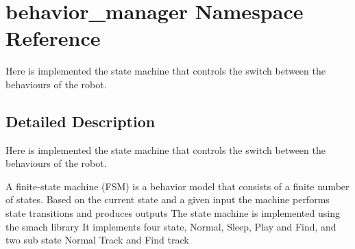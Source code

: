 \hypertarget{namespacebehavior__manager}{}\section{behavior\+\_\+manager Namespace Reference}
\label{namespacebehavior__manager}


Here is implemented the state machine that controls the switch between the behaviours of the robot.  




\subsection{Detailed Description}
Here is implemented the state machine that controls the switch between the behaviours of the robot. 

A finite-\/state machine (F\+SM) is a behavior model that consists of a finite number of states. Based on the current state and a given input the machine performs state transitions and produces outputs The state machine is implemented using the smach library It implements four state, Normal, Sleep, Play and Find, and two sub state Normal Track and Find track 